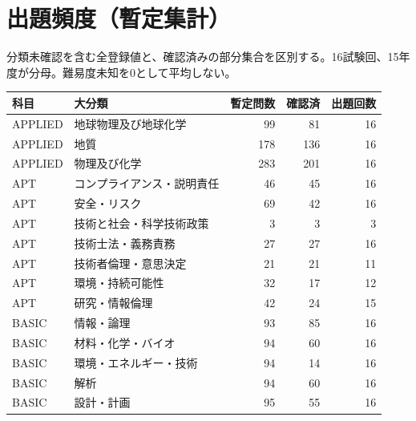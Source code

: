 \chapter{出題頻度（暫定集計）}
分類未確認を含む全登録値と、確認済みの部分集合を区別する。16試験回、15年度が分母。難易度未知を0として平均しない。
\begin{longtable}{p{.16\linewidth}p{.42\linewidth}rrr}
科目 & 大分類 & 暫定問数 & 確認済 & 出題回数\\\hline
APPLIED & 地球物理及び地球化学 & 99 & 81 & 16\\
APPLIED & 地質 & 178 & 136 & 16\\
APPLIED & 物理及び化学 & 283 & 201 & 16\\
APT & コンプライアンス・説明責任 & 46 & 45 & 16\\
APT & 安全・リスク & 69 & 42 & 16\\
APT & 技術と社会・科学技術政策 & 3 & 3 & 3\\
APT & 技術士法・義務責務 & 27 & 27 & 16\\
APT & 技術者倫理・意思決定 & 21 & 21 & 11\\
APT & 環境・持続可能性 & 32 & 17 & 12\\
APT & 研究・情報倫理 & 42 & 24 & 15\\
BASIC & 情報・論理 & 93 & 85 & 16\\
BASIC & 材料・化学・バイオ & 94 & 60 & 16\\
BASIC & 環境・エネルギー・技術 & 94 & 14 & 16\\
BASIC & 解析 & 94 & 60 & 16\\
BASIC & 設計・計画 & 95 & 55 & 16\\
\end{longtable}
